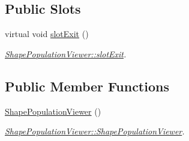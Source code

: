 \subsection*{Public Slots}
\begin{DoxyCompactItemize}
\item 
virtual void \hyperlink{class_shape_population_viewer_a4e328326e343af33bbb6f50368b60fe3}{slot\-Exit} ()
\begin{DoxyCompactList}\small\item\em \hyperlink{class_shape_population_viewer_a4e328326e343af33bbb6f50368b60fe3}{Shape\-Population\-Viewer\-::slot\-Exit}. \end{DoxyCompactList}\end{DoxyCompactItemize}
\subsection*{Public Member Functions}
\begin{DoxyCompactItemize}
\item 
\hyperlink{class_shape_population_viewer_a4f1a26145a1354b29b7b42a02dc8b1cf}{Shape\-Population\-Viewer} ()
\begin{DoxyCompactList}\small\item\em \hyperlink{class_shape_population_viewer_a4f1a26145a1354b29b7b42a02dc8b1cf}{Shape\-Population\-Viewer\-::\-Shape\-Population\-Viewer}. \end{DoxyCompactList}\end{DoxyCompactItemize}
